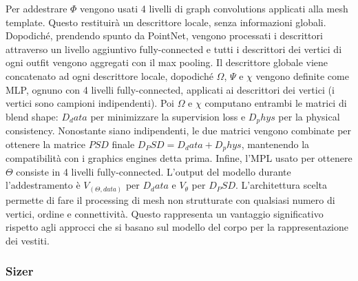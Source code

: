 Per addestrare $\Phi$ vengono usati 4 livelli di graph convolutions applicati alla mesh template. Questo restituirà un descrittore locale, senza informazioni globali. Dopodiché, prendendo spunto da PointNet, vengono processati i descrittori attraverso un livello aggiuntivo fully-connected e tutti i descrittori dei vertici di ogni outfit vengono aggregati con il max pooling. Il descrittore globale viene concatenato ad ogni descrittore locale, dopodiché $\Omega$, $\Psi$ e $\chi$ vengono definite come MLP, ognuno con 4 livelli fully-connected, applicati ai descrittori dei vertici (i vertici sono campioni indipendenti). Poi $\Omega$ e $\chi$ computano entrambi le matrici di blend shape: $D_data$ per minimizzare la supervision loss e $D_phys$ per la physical consistency. Nonostante siano indipendenti, le due matrici vengono combinate per ottenere la matrice $PSD$ finale $D_PSD=D_data+D_phys$, mantenendo la compatibilità con i graphics engines detta prima. Infine, l’MPL usato per ottenere $\Theta$ consiste in 4 livelli fully-connected. L’output del modello durante l’addestramento è $V_(\Theta,data)$ per $D_data$ e $V_\theta$ per $D_PSD$.
L’architettura scelta permette di fare il processing di mesh non strutturate con qualsiasi numero di vertici, ordine e connettività. Questo rappresenta un vantaggio significativo rispetto agli approcci che si basano sul modello del corpo per la rappresentazione dei vestiti.


\subsubsection{Sizer}

